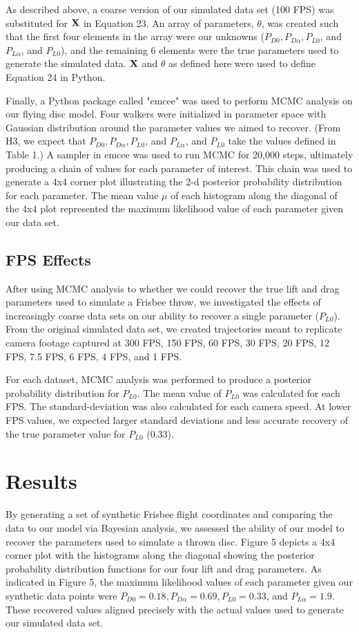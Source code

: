 \documentclass[a4paper,12pt, oneside]{article}
\begin{document}
As described above, a coarse version of our simulated data set (100 FPS) was substituted for $\bold{X}$ in Equation 23. An array of parameters, $\theta$, was created such that the first four elements in the array were our unknowns ($P_{D0}, P_{D\alpha}, P_{L0}$, and $P_{L\alpha}$, and $P_{L0}$), and the remaining 6 elements were the true parameters used to generate the simulated data. $\bold{X}$ and $\theta$ as defined here were used to define Equation 24 in Python.

Finally, a Python package called "emcee" was used to perform MCMC analysis on our flying disc model. Four walkers were initialized in parameter space with Gaussian distribution around the parameter values we aimed to recover. (From H3, we expect that $P_{D0}, P_{D\alpha}, P_{L0}$, and $P_{L\alpha}$, and $P_{L0}$ take the values defined in Table 1.) A sampler in emcee was used to run MCMC for 20,000 steps, ultimately producing a chain of values for each parameter of interest.  This chain was used to generate a 4x4 corner plot illustrating the 2-d posterior probability distribution for each parameter. The mean value $\mu$ of each histogram along the diagonal of the 4x4 plot represented the maximum likelihood value of each parameter given our data set.

\subsection{FPS Effects}
After using MCMC analysis to whether we could recover the true lift and drag parameters used to simulate a Frisbee throw, we investigated the effects of increasingly coarse data sets on our ability to recover a single parameter ($P_{L0}$). From the original simulated data set, we created trajectories meant to replicate camera footage captured at 300 FPS, 150 FPS, 60 FPS, 30 FPS, 20 FPS, 12 FPS, 7.5 FPS, 6 FPS, 4 FPS, and 1 FPS.

For each dataset, MCMC analysis was performed to produce a posterior probability distribution for $P_{L0}$. The mean value of $P_{L0}$ was calculated for each FPS. The standard-deviation was also calculated for each camera speed. At lower FPS values, we expected larger standard deviations and less accurate recovery of the true parameter value for $P_{L0}$ (0.33).

\section{Results}

By generating a set of synthetic Frisbee flight coordinates and comparing the data to our model via Bayesian analysis, we assessed the ability of our model to recover the parameters used to simulate a thrown disc. Figure 5 depicts a 4x4 corner plot with the histograms along the diagonal showing the posterior probability distribution functions for our four lift and drag parameters. As indicated in Figure 5, the maximum likelihood values of each parameter given our synthetic data points were $P_{D0} = 0.18, P_{D\alpha}=0.69, P_{L0}=0.33$, and $P_{L\alpha}=1.9$. These recovered values aligned precisely with the actual values used to generate our simulated data set.
\end{document}
